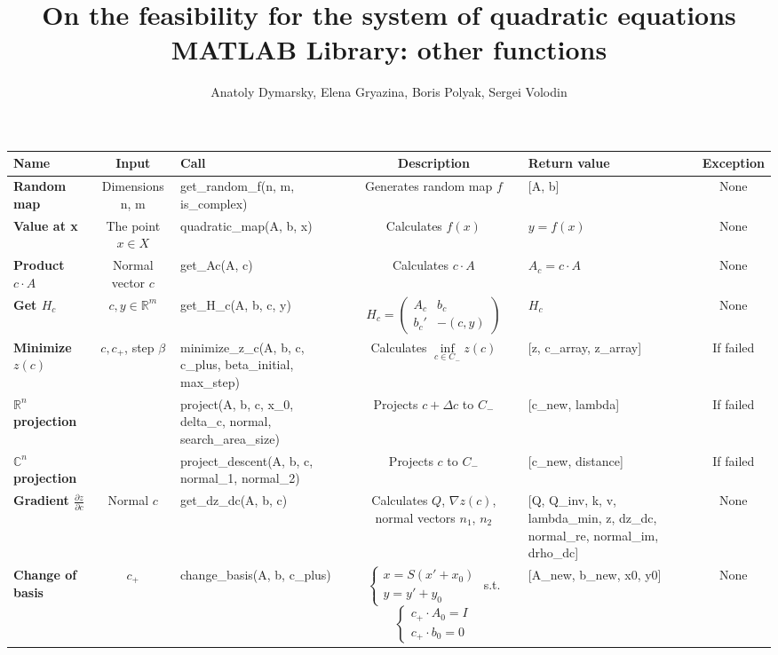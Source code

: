 \documentclass[a4paper]{article}
\title{On the feasibility for the system of quadratic equations\\MATLAB Library: other functions}
\date{}
\author{Anatoly Dymarsky, Elena Gryazina, Boris Polyak, Sergei Volodin}
\newcommand{\R}{\mathbb{R}}
\begin{document}
\maketitle
\begin{tabular}{|p{28mm}|c|p{50mm}|c|p{30mm}|c|}
	\hline
	\bf Name & \bf Input & \bf Call & \bf Description & \bf Return value & \bf Exception\\\hline
	\bf Random map & {Dimensions n, m} & get\_random\_f(n, m, is\_complex) & Generates random map $f$ & [A, b] & None\\\hline
	\bf Value at x & The point $x\in X$ & quadratic\_map(A, b, x) & Calculates $f(x)$ & $y=f(x)$ & None\\\hline
	\bf Product $c\cdot A$ & Normal vector $c$ & get\_Ac(A, c) & Calculates $c\cdot A$ & $A_c=c\cdot A$ & None\\\hline
	\bf Get $H_c$ & $c,y\in\R^m$ & get\_H\_c(A, b, c, y) & $H_c=\left(\begin{array}{cc}A_c & b_c\\b_c' &-(c,y) \end{array}\right)$ & $H_c$ & None\\\hline
	\bf Minimize $z(c)$ & $c,c_+$, step $\beta$ & minimize\_z\_c(A, b, c, c\_plus, beta\_initial, max\_step) & Calculates $\inf\limits_{c\in C_-}z(c)$ & [z, c\_array, z\_array] & If failed\\\hline
	\bf  $\R^n$ projection & & project(A, b, c, x\_0, delta\_c, normal, search\_area\_size) & Projects $c+\Delta c$ to $C_-$ & [c\_new, lambda] & If failed\\\hline
	\bf $\mathbb{C}^n$ projection & & project\_descent(A, b, c, normal\_1, normal\_2) & Projects $c$ to $C_-$ & [c\_new, distance] & If failed\\\hline
	\bf Gradient $\frac{\partial z}{\partial c}$ & Normal $c$ & get\_dz\_dc(A, b, c) & Calculates $Q$, $\nabla z(c)$, normal vectors $n_1$, $n_2$ & [Q, Q\_inv, k, v, lambda\_min, z, dz\_dc, normal\_re, normal\_im, drho\_dc] & None\\\hline
	\bf Change of basis & $c_+$ & change\_basis(A, b, c\_plus) & $\begin{cases}
	x = S(x'+x_0)\\
	y = y' + y_0
	\end{cases}
	$ s.t.
	$\begin{cases}
	c_+\cdot A_0=I\\
	c_+\cdot b_0=0
	\end{cases}$ & [A\_new, b\_new, x0, y0] & None\\\hline
\end{tabular}
\end{document}
